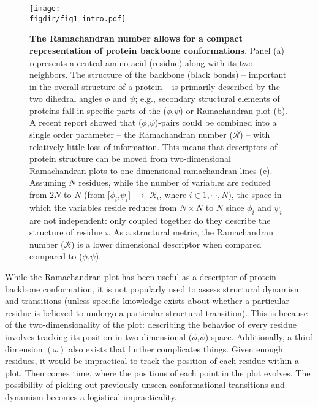 \documentclass[fleqn,10pt]{wlpeerj} %
\newcommand{\rr}{$\mathcal{R}$\xspace}
\newcommand{\figdir}{./figures}
\begin{document}
\begin{figure}[t!]
\centering
\texttt{[image: \\figdir/fig1\_intro.pdf]}
\caption{\textbf{The Ramachandran number allows for a compact representation of protein backbone conformations}. Panel (a) represents a central amino acid (residue) along with its two neighbors. The structure of the backbone (black bonds) -- important in the overall structure of a protein -- is primarily described by the two dihedral angles $\phi$ and $\psi$; e.g., secondary structural elements of proteins fall in specific parts of the ($\phi$,$\psi$) or Ramachandran plot (b). %
A recent report \citep{MannigeKunduWhitelam2016} showed that ($\phi$,$\psi$)-pairs could be combined into a single order parameter -- the Ramachandran number (\rr) -- with relatively little loss of information. This means that descriptors of protein structure can be moved from two-dimensional Ramachandran plots to one-dimensional ramachandran lines (c). Assuming $N$ residues, while the number of variables are reduced from $2N$ to $N$ (from [$\phi_i$,$\psi_i$] $\to$ \rr$_i$, where $i\in{1,\cdots, N}$), the space in which the variables reside reduces from $N \times N$ to $N$ since $\phi_i$ and $\psi_i$ are not independent: only coupled together do they describe the structure of residue $i$. As a structural metric, the Ramachandran number (\rr)  is a lower dimensional descriptor when compared compared to ($\phi$,$\psi$).\label{fig:intro}} 
\end{figure}

While the Ramachandran plot has been useful as a descriptor of protein backbone conformation, it is not popularly used to assess structural dynamism and transitions (unless specific knowledge exists about whether a particular residue is believed to undergo a particular structural transition). This is because of the two-dimensionality of the plot: describing the behavior of every residue involves tracking its position in two-dimensional ($\phi$,$\psi$) space. Additionally, a third dimension $(\omega)$ also exists that further complicates things. Given enough residues, it would be impractical to track the position of each residue within a plot. Then comes time, where the positions of each point in the plot evolves. The possibility of picking out previously unseen conformational transitions and dynamism becomes a logistical impracticality.
\end{document}

